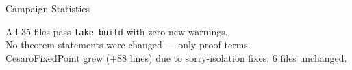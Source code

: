 \documentclass[aspectratio=169,10pt]{beamer}
\begin{document}
\begin{frame}{Campaign Statistics}
    \vspace{0.3em}
    \begin{center}
    {\small
    \textcolor{leangreen}{\checkmark} All 35 files pass \texttt{lake build} with zero new warnings.\\
    \textcolor{leangreen}{\checkmark} No theorem statements were changed --- only proof terms.\\
    \textcolor{dimwhite}{\scriptsize * CesaroFixedPoint grew (+88 lines) due to sorry-isolation fixes; 6 files unchanged.}
    }
    \end{center}
\end{frame}

\end{document}
